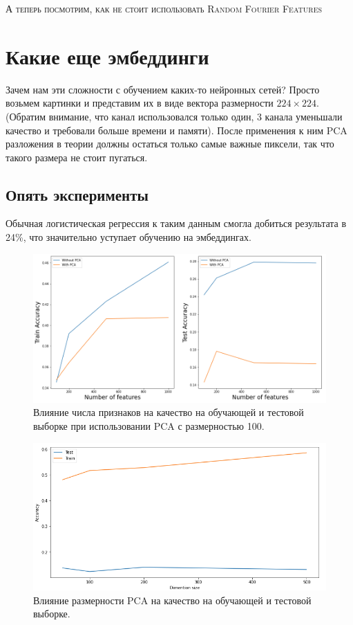 \documentclass{article}
\begin{document}
\bigskip

\noindent
\textsc{А теперь посмотрим, как не стоит использовать Random Fourier Features}

\section{Какие еще эмбеддинги}

Зачем нам эти сложности с обучением каких-то нейронных сетей? Просто возьмем картинки и представим их в виде вектора размерности $224 \times 224$. (Обратим внимание, что канал использовался только один, 3 канала уменьшали качество и требовали больше времени и памяти). После применения к ним PCA разложения в теории должны остаться только самые важные пиксели, так что такого размера не стоит пугаться.

\subsection{Опять эксперименты}

Обычная логистическая регрессия к таким данным смогла добиться результата в 24\%, что значительно уступает обучению на эмбеддингах. 

\begin{figure}[H]
    \centering
    \includegraphics[width=12cm]{images/cauchy_pca_diff.png}
    \caption{Влияние числа признаков на качество на обучающей и тестовой выборке при использовании PCA с размерностью 100.}
    \label{fig:my_label}
\end{figure}{}


\begin{figure}[H]
    \centering
    \includegraphics[width=12cm]{images/n_dim_simple.png}
    \caption{Влияние размерности PCA на качество на обучающей и тестовой выборке.}
    \label{fig:my_label}
\end{figure}{}
\end{document}
